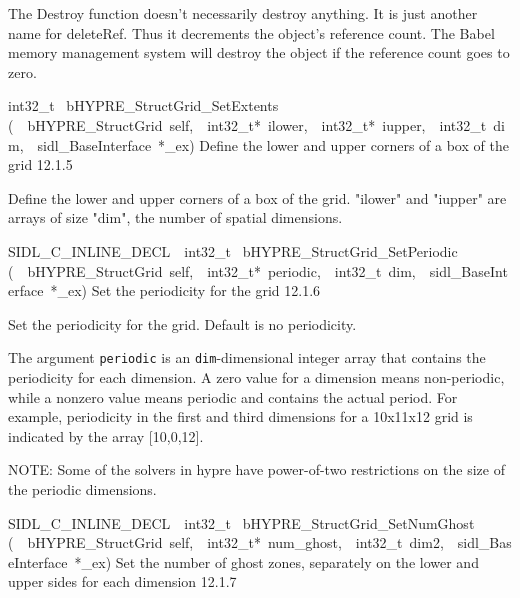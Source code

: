 \documentclass{article}
\begin{document}
\begin{cxxentry}
\begin{cxxentry}
\begin{cxxfunction}
\begin{cxxdoc}
The Destroy function doesn't necessarily destroy anything.
It is just another name for deleteRef.  Thus it decrements the
object's reference count.  The Babel memory management system will
destroy the object if the reference count goes to zero.
\end{cxxdoc}
\end{cxxfunction}
\begin{cxxfunction}
{int32\_t\ }
        {bHYPRE\_StructGrid\_SetExtents}
        {(\ \ bHYPRE\_StructGrid\ self,\ \ int32\_t*\ ilower,\ \ int32\_t*\ iupper,\ \ int32\_t\ dim,\ \ sidl\_BaseInterface\ *\_ex)}
        {
Define the lower and upper corners of a box of the grid}
        {12.1.5}
\begin{cxxdoc}

Define the lower and upper corners of a box of the grid.
"ilower" and "iupper" are arrays of size "dim", the number of spatial
dimensions. 
\end{cxxdoc}
\end{cxxfunction}
\begin{cxxfunction}
{SIDL\_C\_INLINE\_DECL\ \ int32\_t\ }
        {bHYPRE\_StructGrid\_SetPeriodic}
        {(\ \ bHYPRE\_StructGrid\ self,\ \ int32\_t*\ periodic,\ \ int32\_t\ dim,\ \ sidl\_BaseInterface\ *\_ex)}
        {
Set the periodicity for the grid}
        {12.1.6}
\begin{cxxdoc}

Set the periodicity for the grid.  Default is no periodicity.

The argument {\tt periodic} is an {\tt dim}-dimensional integer array that
contains the periodicity for each dimension.  A zero value for a dimension
means non-periodic, while a nonzero value means periodic and contains the
actual period.  For example, periodicity in the first and third dimensions
for a 10x11x12 grid is indicated by the array [10,0,12].

NOTE: Some of the solvers in hypre have power-of-two restrictions on the size
of the periodic dimensions.
\end{cxxdoc}
\end{cxxfunction}
\begin{cxxfunction}
{SIDL\_C\_INLINE\_DECL\ \ int32\_t\ }
        {bHYPRE\_StructGrid\_SetNumGhost}
        {(\ \ bHYPRE\_StructGrid\ self,\ \ int32\_t*\ num\_ghost,\ \ int32\_t\ dim2,\ \ sidl\_BaseInterface\ *\_ex)}
        {
Set the number of ghost zones, separately on the lower and upper sides
for each dimension}
        {12.1.7}
\begin{cxxdoc}


\end{cxxdoc}
\end{cxxfunction}
\end{cxxentry}
\end{cxxentry}
\end{document}
